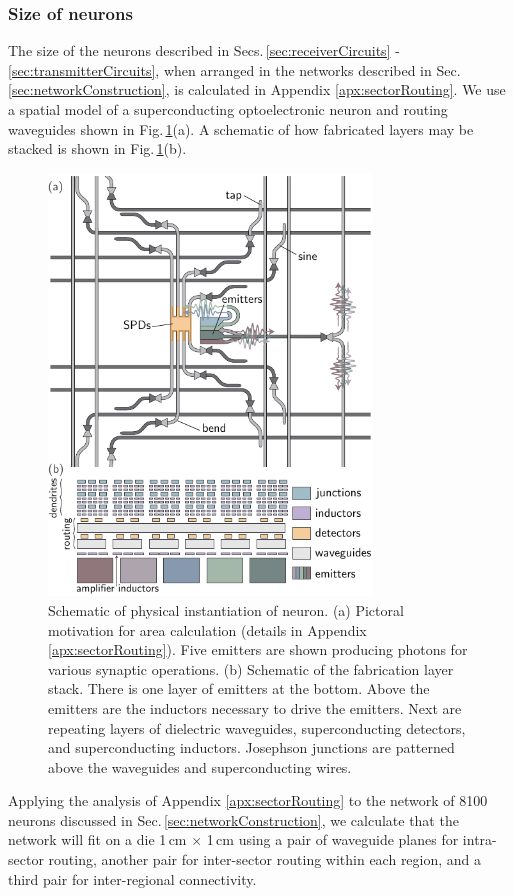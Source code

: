 \documentclass[twocolumn]{article}
\begin{document}
\subsubsection{\label{sec:sizeOfNeurons}Size of neurons} 
The size of the neurons described in Secs.\,\ref{sec:receiverCircuits} - \ref{sec:transmitterCircuits}, when arranged in the networks described in Sec.\,\ref{sec:networkConstruction}, is calculated in Appendix \ref{apx:sectorRouting}. We use a spatial model of a superconducting optoelectronic neuron and routing waveguides shown in Fig.\,\ref{fig:networks_areaDiagram}(a). A schematic of how fabricated layers may be stacked is shown in Fig.\,\ref{fig:networks_areaDiagram}(b). 
\begin{figure}[t!]
	\centerline{\includegraphics[width=8.6cm]{_networks_areaDiagram_small.pdf}}
	\caption{\label{fig:networks_areaDiagram}Schematic of physical instantiation of neuron. (a) Pictoral motivation for area calculation (details in Appendix \ref{apx:sectorRouting}). Five emitters are shown producing photons for various synaptic operations. (b) Schematic of the fabrication layer stack. There is one layer of emitters at the bottom. Above the emitters are the inductors necessary to drive the emitters. Next are repeating layers of dielectric waveguides, superconducting detectors, and superconducting inductors. Josephson junctions are patterned above the waveguides and superconducting wires.}
\end{figure} 
Applying the analysis of Appendix \ref{apx:sectorRouting} to the network of 8100 neurons discussed in Sec.\,\ref{sec:networkConstruction}, we calculate that the network will fit on a die 1\,cm $\times$ 1\,cm using a pair of waveguide planes for intra-sector routing, another pair for inter-sector routing within each region, and a third pair for inter-regional connectivity. 
\end{document}
